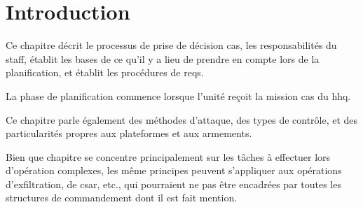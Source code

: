 \section{Introduction}

Ce chapitre décrit le processus de prise de décision \gls{cas}, les responsabilités du staff, établit les bases de ce qu'il y a lieu de prendre en compte lors de la planification, et établit les procédures de \glspl{req}.

La phase de planification commence lorsque l'unité reçoit la mission \gls{cas} du \gls{hhq}.

Ce chapitre parle également des méthodes d'attaque, des types de contrôle, et des particularités propres aux plateformes et aux armements.

Bien que chapitre se concentre principalement sur les tâches à effectuer lors d'opération complexes, les même principes peuvent s'appliquer aux opérations d'exfiltration, de \gls{csar}, etc., qui pourraient ne pas être encadrées par toutes les structures de commandement dont il est fait mention.

